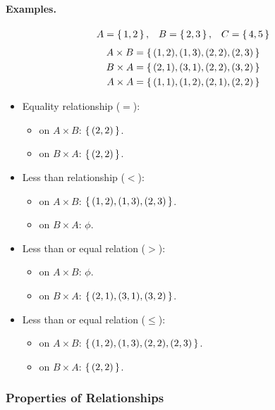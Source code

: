 \paragraph{Examples. }
\begin{align*}
        \space A = \set{1,2} , && B = \set{2,3} , && C = \set{4,5}
\end{align*}
\begin{align*}
        A \times B = \set{(1,2),(1,3),(2,2),(2,3)} \\
        B \times A = \set{(2,1),(3,1),(2,2),(3,2)} \\
        A \times A = \set{(1,1),(1,2),(2,1),(2,2)} \\
\end{align*}
\begin{itemize}
    \item Equality relationship ($=$):
        \begin{itemize}
            \item  on $A \times B$: $\set{(2,2)}$.
            \item on $B \times A$: $\set{(2,2)}$.
        \end{itemize}
    \item Less than relationship ($<$):
        \begin{itemize}
            \item  on $A \times B$: $\set{(1,2),(1,3),(2,3)}$.
            \item  on $B \times A$: $\phi$.
        \end{itemize}
    \item Less than or equal relation ($>$):
        \begin{itemize}
            \item  on $A \times B$: $\phi$.
            \item  on $B \times A$: $\set{(2,1),(3,1),(3,2)}$.
        \end{itemize}
    \item Less than or equal relation ($\leq$):
        \begin{itemize}
            \item  on $A \times B$: $\set{(1,2),(1,3),(2,2),(2,3)}$.
            \item  on $B \times A$: $\set{(2,2)}$.
        \end{itemize}
\end{itemize}

\subsubsection{Properties of Relationships}

